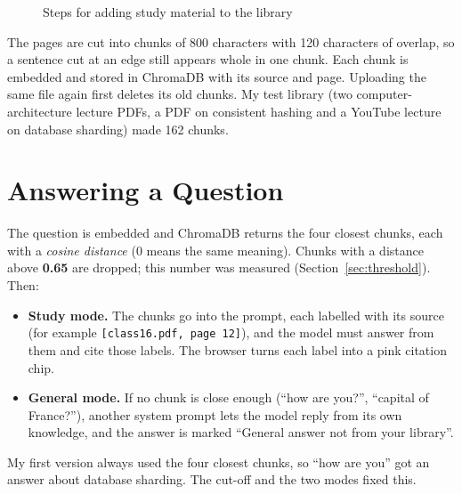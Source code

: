 \documentclass[12pt,a4paper]{report}
\newcommand{\code}[1]{\texttt{#1}}
\begin{document}
\begin{figure}[H]
\centering
{}
\caption{Steps for adding study material to the library}\label{fig:index}
\end{figure}

The pages are cut into chunks of 800 characters with 120 characters of overlap, so a
sentence cut at an edge still appears whole in one chunk. Each chunk is embedded and stored
in ChromaDB with its source and page. Uploading the same file again first deletes its old
chunks. My test library (two computer-architecture lecture PDFs, a PDF on consistent hashing
and a YouTube lecture on database sharding) made 162 chunks.

\section{Answering a Question}\label{sec:chat}
The question is embedded and ChromaDB returns the four closest chunks, each with a
\emph{cosine distance} (0 means the same meaning). Chunks with a distance above
\textbf{0.65} are dropped; this number was measured (Section~\ref{sec:threshold}). Then:
\begin{itemize}
  \item \textbf{Study mode.} The chunks go into the prompt, each labelled with its source
        (for example \code{[class16.pdf, page 12]}), and the model must answer from them
        and cite those labels. The browser turns each label into a pink citation chip.
  \item \textbf{General mode.} If no chunk is close enough (``how are you?'', ``capital of
        France?''), another system prompt lets the model reply from its own knowledge, and
        the answer is marked ``General answer \textperiodcentered{} not from your library''.
\end{itemize}
My first version always used the four closest chunks, so ``how are you'' got an answer about
database sharding. The cut-off and the two modes fixed this.
\end{document}

